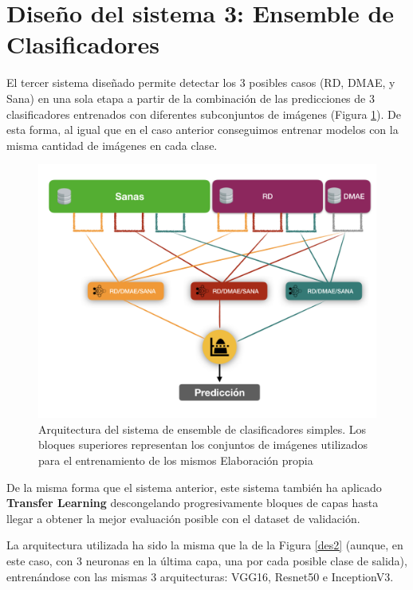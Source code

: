 \documentclass[
  12pt,
  spanish,
  a4paperpaper,
]{report}
\begin{document}
\hypertarget{diseuxf1o-del-sistema-3-ensemble-de-clasificadores}{%
\section{Diseño del sistema 3: Ensemble de
Clasificadores}\label{diseuxf1o-del-sistema-3-ensemble-de-clasificadores}}

El tercer sistema diseñado permite detectar los 3 posibles casos (RD,
DMAE, y Sana) en una sola etapa a partir de la combinación de las
predicciones de 3 clasificadores entrenados con diferentes subconjuntos
de imágenes (Figura \ref{design3}). De esta forma, al igual que en el
caso anterior conseguimos entrenar modelos con la misma cantidad de
imágenes en cada clase.

\begin{figure}
\centering
\includegraphics[width=1\textwidth,height=\textheight]{source/figures/design3.png}
\caption{Arquitectura del sistema de ensemble de clasificadores simples.
Los bloques superiores representan los conjuntos de imágenes utilizados
para el entrenamiento de los mismos Elaboración propia \label{design3}}
\end{figure}

De la misma forma que el sistema anterior, este sistema también ha
aplicado \textbf{Transfer Learning} descongelando progresivamente
bloques de capas hasta llegar a obtener la mejor evaluación posible con
el dataset de validación.

La arquitectura utilizada ha sido la misma que la de la Figura
\ref{des2} (aunque, en este caso, con 3 neuronas en la última capa, una
por cada posible clase de salida), entrenándose con las mismas 3
arquitecturas: VGG16, Resnet50 e InceptionV3.
\end{document}

